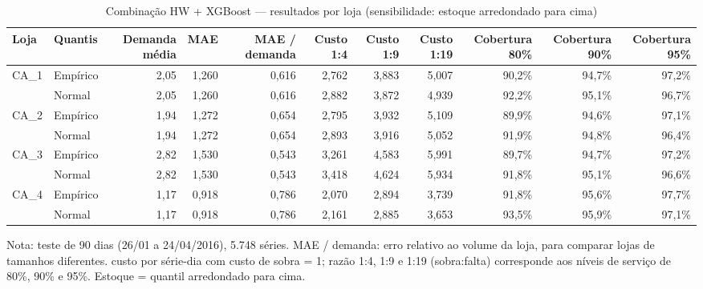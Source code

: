 \begin{table}[htbp]
\centering
\small
\caption{Combinação HW + XGBoost — resultados por loja (sensibilidade: estoque arredondado para cima)}
\label{tab:comb_por_loja_sensibilidade}
\begin{tabular}{llrrrrrrrrr}
\toprule
Loja & Quantis & Demanda média & MAE & MAE / demanda & Custo 1:4 & Custo 1:9 & Custo 1:19 & Cobertura 80\% & Cobertura 90\% & Cobertura 95\% \\
\midrule
CA\_1 & Empírico & 2,05 & 1,260 & 0,616 & 2,762 & 3,883 & 5,007 & 90,2\% & 94,7\% & 97,2\% \\
 & Normal & 2,05 & 1,260 & 0,616 & 2,882 & 3,872 & 4,939 & 92,2\% & 95,1\% & 96,7\% \\
\addlinespace
CA\_2 & Empírico & 1,94 & 1,272 & 0,654 & 2,795 & 3,932 & 5,109 & 89,9\% & 94,6\% & 97,1\% \\
 & Normal & 1,94 & 1,272 & 0,654 & 2,893 & 3,916 & 5,052 & 91,9\% & 94,8\% & 96,4\% \\
\addlinespace
CA\_3 & Empírico & 2,82 & 1,530 & 0,543 & 3,261 & 4,583 & 5,991 & 89,7\% & 94,7\% & 97,2\% \\
 & Normal & 2,82 & 1,530 & 0,543 & 3,418 & 4,624 & 5,934 & 91,8\% & 95,1\% & 96,6\% \\
\addlinespace
CA\_4 & Empírico & 1,17 & 0,918 & 0,786 & 2,070 & 2,894 & 3,739 & 91,8\% & 95,6\% & 97,7\% \\
 & Normal & 1,17 & 0,918 & 0,786 & 2,161 & 2,885 & 3,653 & 93,5\% & 95,9\% & 97,1\% \\
\bottomrule
\end{tabular}
\par\smallskip
{\footnotesize Nota: teste de 90 dias (26/01 a 24/04/2016), 5.748 séries. MAE / demanda: erro relativo ao volume da loja, para comparar lojas de tamanhos diferentes. custo por série-dia com custo de sobra = 1; razão 1:4, 1:9 e 1:19 (sobra:falta) corresponde aos níveis de serviço de 80\%, 90\% e 95\%. Estoque = quantil arredondado para cima.}
\end{table}
